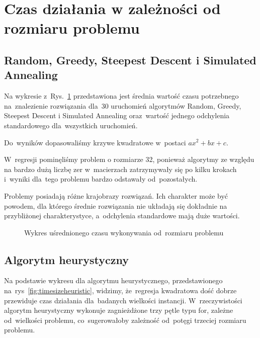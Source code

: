\documentclass[a4paper,10pt]{article}
\begin{document}
\section{Czas działania w zależności od rozmiaru problemu}
\subsection{Random, Greedy, Steepest Descent i Simulated Annealing}
Na wykresie z~Rys.~\ref{fig:timesize} przedstawiona jest średnia wartość czasu potrzebnego na~znalezienie rozwiązania dla~30 uruchomień algorytmów Random, Greedy, Steepest Descent i Simulated Annealing oraz~wartość jednego odchylenia standardowego dla~wszystkich uruchomień.

Do~wyników dopasowaliśmy krzywe kwadratowe w~postaci $ax^2+bx+c$.

W~regresji pominęliśmy problem o rozmiarze 32, ponieważ algorytmy ze względu na bardzo dużą liczbę zer
w~macierzach zatrzymywały się po kilku krokach i~wyniki dla~tego problemu bardzo odstawały od~pozostałych.


Problemy posiadają różne krajobrazy rozwiązań.
Ich charakter może być powodem, dla którego średnie rozwiązania nie układają się dokładnie na przybliżonej charakterystyce,
a~odchylenia standardowe mają duże wartości.

\begin{figure}[!htpb]
\begin{center}

\caption{Wykres uśrednionego czasu wykonywania od~rozmiaru problemu}
\label{fig:timesize}
\end{center}
\end{figure}

\subsection{Algorytm heurystyczny}
Na podstawie wykresu dla algorytmu heurystycznego, przedstawionego na~rys~\ref{fig:timesizeheuristic},
widzimy, że~regresja kwadratowa dość dobrze przewiduje czas działania dla~badanych wielkości instancji.
W~rzeczywistości algorytm heurystyczny wykonuje zagnieżdżone trzy pętle typu for, zależne od~wielkości problemu,
co~sugerowałoby zależność od~potęgi trzeciej rozmiaru problemu.
\end{document}
